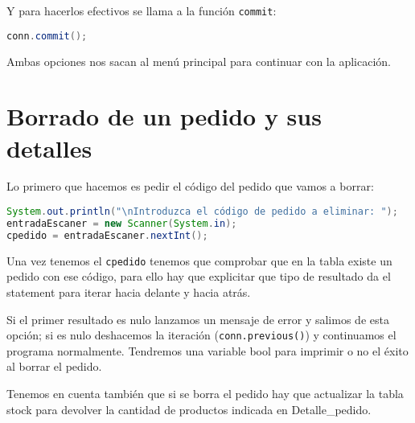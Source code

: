 Y para hacerlos efectivos se llama a la función \texttt{commit}:

\begin{lstlisting}[language=Java]
conn.commit();
\end{lstlisting}

Ambas opciones nos sacan al menú principal para continuar con la aplicación.

\section{Borrado de un pedido y sus detalles}

Lo primero que hacemos es pedir el código del pedido que vamos a borrar:

\begin{lstlisting}[language=Java]
System.out.println("\nIntroduzca el código de pedido a eliminar: ");
entradaEscaner = new Scanner(System.in);
cpedido = entradaEscaner.nextInt();
\end{lstlisting}

Una vez tenemos el \texttt{cpedido} tenemos que comprobar que en la tabla existe un pedido con ese código, para ello hay que explicitar que tipo de resultado da el statement para iterar hacia delante y hacia atrás.

Si el primer resultado es nulo lanzamos un mensaje de error y salimos de esta opción; si es nulo deshacemos la iteración (\texttt{conn.previous()}) y continuamos el programa normalmente. Tendremos una variable bool para imprimir o no el éxito al borrar el pedido.

Tenemos en cuenta también que si se borra el pedido hay que actualizar la tabla stock para devolver la cantidad de productos indicada en Detalle\_pedido.

